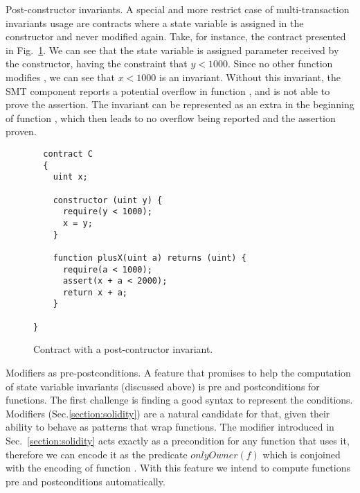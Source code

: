 \begin{paragraph}{Post-constructor invariants.}
A special and more restrict case of multi-transaction invariants usage are
contracts where a state variable is assigned in the constructor and never
modified again.
%
Take, for instance, the contract presented in Fig.~\ref{fig:constructor}.
%
We can see that the state variable  is assigned parameter 
received by the constructor, having the constraint that $y < 1000$.
%
Since no other function modifies , we can see that $x < 1000$ is an
invariant.
%
Without this invariant, the SMT component reports a potential overflow in
function , and is not able to prove the assertion.
%
The invariant can be represented as an extra  in the
beginning of function , which then leads to no overflow being
reported and the assertion proven.

\begin{figure}
\begin{verbatim}
  contract C
  {
    uint x;

    constructor (uint y) {
      require(y < 1000);
      x = y;
    }

    function plusX(uint a) returns (uint) {
      require(a < 1000);
      assert(x + a < 2000);
      return x + a;
    }

}
\end{verbatim}
\caption{Contract with a post-contructor invariant.}
\label{fig:constructor}
\end{figure}

\end{paragraph}

\begin{paragraph}{Modifiers as pre-postconditions.}
A feature that promises to help the computation of state variable invariants
(discussed above) is pre and postconditions for functions.
%
The first challenge is finding a good syntax to represent the conditions.
%
Modifiers (Sec.\ref{section:solidity}) are a natural candidate for that, given
their ability to behave as patterns that wrap functions.
%
The modifier  introduced in Sec.~\ref{section:solidity} acts
exactly as a precondition for any function that uses it, therefore we can
encode it as the predicate $onlyOwner(f)$ which is conjoined with the encoding
of function .
%
With this feature we intend to compute functions pre and postconditions
automatically.
\end{paragraph}


